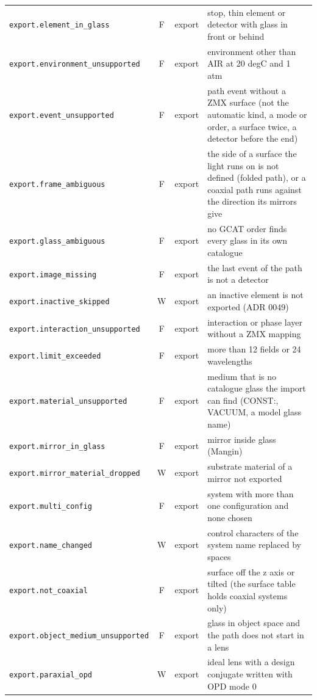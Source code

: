 \documentclass[11pt,a4paper,openany]{book}
\begin{document}
{\begin{longtable}{@{}L{6.1cm}cL{1.3cm}L{6.9cm}@{}}
\texttt{export.element\_in\_glass} & F & export & stop, thin element or detector with glass in front or behind \\
\texttt{export.environment\_unsupported} & F & export & environment other than AIR at 20 degC and 1 atm \\
\texttt{export.event\_unsupported} & F & export & path event without a ZMX surface (not the automatic kind, a mode or order, a surface twice, a detector before the end) \\
\texttt{export.frame\_ambiguous} & F & export & the side of a surface the light runs on is not defined (folded path), or a coaxial path runs against the direction its mirrors give \\
\texttt{export.glass\_ambiguous} & F & export & no GCAT order finds every glass in its own catalogue \\
\texttt{export.image\_missing} & F & export & the last event of the path is not a detector \\
\texttt{export.inactive\_skipped} & W & export & an inactive element is not exported (ADR 0049) \\
\texttt{export.interaction\_unsupported} & F & export & interaction or phase layer without a ZMX mapping \\
\texttt{export.limit\_exceeded} & F & export & more than 12 fields or 24 wavelengths \\
\texttt{export.material\_unsupported} & F & export & medium that is no catalogue glass the import can find (CONST:, VACUUM, a model glass name) \\
\texttt{export.mirror\_in\_glass} & F & export & mirror inside glass (Mangin) \\
\texttt{export.mirror\_material\_dropped} & W & export & substrate material of a mirror not exported \\
\texttt{export.multi\_config} & F & export & system with more than one configuration and none chosen \\
\texttt{export.name\_changed} & W & export & control characters of the system name replaced by spaces \\
\texttt{export.not\_coaxial} & F & export & surface off the z axis or tilted (the surface table holds coaxial systems only) \\
\texttt{export.object\_medium\_unsupported} & F & export & glass in object space and the path does not start in a lens \\
\texttt{export.paraxial\_opd} & W & export & ideal lens with a design conjugate written with OPD mode 0 \\

\end{longtable}}
\end{document}
